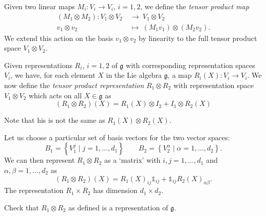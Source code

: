 \begin{definition}[]
  Given two linear maps $M_i \colon V_i \to V_i$, $i = 1, 2$, we define the \emph{tensor product map}
  \begin{equation}
    \begin{split}
      (M_1 \otimes M_2) \colon V_1 \otimes V_2 \ &\to\  V_1 \otimes V_2 \\
      v_1 \otimes v_2 \ &\mapsto\  (M_1 v_1) \otimes (M_2 v_2).
    \end{split}
  \end{equation}
  We extend this action on the basis $v_1 \otimes v_2$ by linearity to the full tensor product space $V_1 \otimes V_2$.
\end{definition}

\begin{definition}[]
  Given representations $R_i$, $i = 1, 2$ of $\mathfrak{g}$ with corresponding representation spaces $V_i$, we have, for each element $X$ in the Lie algebra $\mathfrak{g}$, a map $R_i(X) \colon V_i \to V_i$.
  We now define the \emph{tensor product representation} $R_1 \otimes R_2$ with representation space $V_1 \otimes V_2$ which acts on all $X \in \mathfrak{g}$ as
  \begin{equation}
    \boxed{(R_1 \otimes R_2)(X) = R_1(X) \otimes I_2 + I_1 \otimes R_2(X)}
  \end{equation}
\end{definition}
\begin{leftbar}
  \begin{remark}
    Note that his is not the same as $R_1(X) \otimes R_2(X)$.
  \end{remark}
\end{leftbar}
Let us choose a particular set of basis vectors for the two vector spaces:
\begin{equation}
  B_1 = \left\{ V_1^j \mid j = 1, \dots , d_1 \right\} \qquad B_2 = \left\{ V_2^\alpha \mid \alpha = 1 ,\dots, d_2 \right\}.
\end{equation}
We can then represent $R_1 \otimes R_2$ as a `matrix' with $i, j = 1 , \dots, d_1$ and $\alpha, \beta = 1, \dots, d_2$ as
\begin{equation}
  (R_1 \otimes R_2)(X) = R_1(X)_{ij} \mathbb{1}_{ij} + \mathbb{1}_{ij} R_2(X)_{\alpha\beta}.
\end{equation}
The representation $R_1 \times R_2$ has dimension $d_1 \times d_2$.

\begin{exercise}
  Check that $R_1 \otimes R_2$ as defined is a representation of $\mathfrak{g}$.
\end{exercise}

